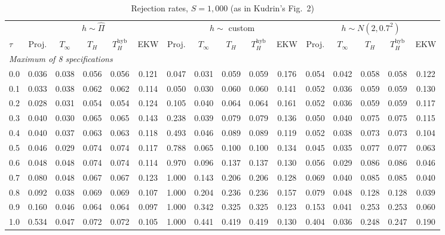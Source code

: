 \begin{table}[htbp]
\centering
\caption{Rejection rates, $S = 1{,}000$ (as in Kudrin's Fig.~2)}
\label{tab:kudrin_style_var_dial_plus_gammahat_S1000}
\footnotesize
\setlength{\tabcolsep}{4pt}
\begin{tabular}{lccccccccccccccc}
\toprule
 & \multicolumn{5}{c}{$h \sim \hat{\Pi}$} & \multicolumn{5}{c}{$h \sim$ custom} & \multicolumn{5}{c}{$h \sim N(2, 0.7^2)$} \\
\cmidrule(lr){2-6} \cmidrule(lr){7-11} \cmidrule(lr){12-16}
$\tau$ & Proj. & $T_\infty$ & $T_H$ & $T_H^{\mathrm{hyb}}$ & EKW & Proj. & $T_\infty$ & $T_H$ & $T_H^{\mathrm{hyb}}$ & EKW & Proj. & $T_\infty$ & $T_H$ & $T_H^{\mathrm{hyb}}$ & EKW \\
\midrule
\multicolumn{16}{l}{\textit{Maximum of 8 specifications}} \\
0.0 & 0.036 & 0.038 & 0.056 & 0.056 & 0.121 & 0.047 & 0.031 & 0.059 & 0.059 & 0.176 & 0.054 & 0.042 & 0.058 & 0.058 & 0.122 \\
0.1 & 0.033 & 0.038 & 0.062 & 0.062 & 0.114 & 0.050 & 0.030 & 0.060 & 0.060 & 0.141 & 0.052 & 0.036 & 0.059 & 0.059 & 0.130 \\
0.2 & 0.028 & 0.031 & 0.054 & 0.054 & 0.124 & 0.105 & 0.040 & 0.064 & 0.064 & 0.161 & 0.052 & 0.036 & 0.059 & 0.059 & 0.117 \\
0.3 & 0.040 & 0.030 & 0.065 & 0.065 & 0.143 & 0.238 & 0.039 & 0.079 & 0.079 & 0.136 & 0.050 & 0.040 & 0.075 & 0.075 & 0.115 \\
0.4 & 0.040 & 0.037 & 0.063 & 0.063 & 0.118 & 0.493 & 0.046 & 0.089 & 0.089 & 0.119 & 0.052 & 0.038 & 0.073 & 0.073 & 0.104 \\
0.5 & 0.046 & 0.029 & 0.074 & 0.074 & 0.117 & 0.788 & 0.065 & 0.100 & 0.100 & 0.134 & 0.045 & 0.035 & 0.077 & 0.077 & 0.063 \\
0.6 & 0.048 & 0.048 & 0.074 & 0.074 & 0.114 & 0.970 & 0.096 & 0.137 & 0.137 & 0.130 & 0.056 & 0.029 & 0.086 & 0.086 & 0.046 \\
0.7 & 0.080 & 0.048 & 0.067 & 0.067 & 0.123 & 1.000 & 0.143 & 0.206 & 0.206 & 0.128 & 0.069 & 0.040 & 0.085 & 0.085 & 0.040 \\
0.8 & 0.092 & 0.038 & 0.069 & 0.069 & 0.107 & 1.000 & 0.204 & 0.236 & 0.236 & 0.157 & 0.079 & 0.048 & 0.128 & 0.128 & 0.039 \\
0.9 & 0.160 & 0.046 & 0.064 & 0.064 & 0.097 & 1.000 & 0.342 & 0.325 & 0.325 & 0.123 & 0.153 & 0.041 & 0.253 & 0.253 & 0.060 \\
1.0 & 0.534 & 0.047 & 0.072 & 0.072 & 0.105 & 1.000 & 0.441 & 0.419 & 0.419 & 0.130 & 0.404 & 0.036 & 0.248 & 0.247 & 0.190 \\

\end{tabular}
\end{table}
